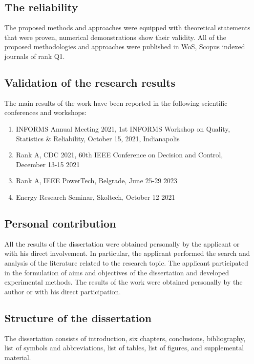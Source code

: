 \subsection*{The reliability}
The proposed methods and approaches were equipped with theoretical statements that were proven, numerical demonstrations show their validity. All of the proposed methodologies and approaches were published in WoS, Scopus indexed journals of rank Q1.
\subsection*{Validation of the research results}
The main results of the work have been reported in the following scientific conferences and workshops:

\begin{enumerate}
    \item INFORMS Annual Meeting 2021, 1st INFORMS Workshop on Quality, Statistics \& Reliability, October 15, 2021, Indianapolis
    \item Rank A, CDC 2021, 60th IEEE Conference on Decision and Control, December 13-15 2021
    \item Rank A, IEEE PowerTech, Belgrade, June 25-29 2023
    \item Energy Research Seminar, Skoltech, October 12 2021
\end{enumerate}

\subsection*{Personal contribution} All the results of the dissertation were obtained personally by the 
applicant or with his direct involvement. In particular, the applicant performed the search 
and  analysis  of  the  literature  related  to  the  research  topic.  The  applicant  participated in the formulation of aims and objectives of 
the  dissertation  and  developed  experimental  methods.  The  results  of  the  work  were obtained personally by the author or with his direct participation. 

\subsection*{Structure of the dissertation} The dissertation consists of introduction, six chapters, conclusions, bibliography, list of symbols and abbreviations, list of tables, list of figures, and supplemental material.